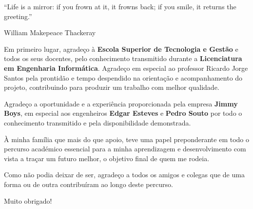 
\begin{flushright}
	\begin{quotebox50}
		``Life is a mirror: if you frown at it, it frowns back; if you smile, it returns the greeting.''

		\tcblower

		William Makepeace Thackeray
	\end{quotebox50}
\end{flushright}

Em primeiro lugar, agradeço à \textbf{Escola Superior de Tecnologia e Gestão} e todos os seus docentes, pelo conhecimento transmitido durante a \textbf{Licenciatura em Engenharia Informática}. Agradeço em especial ao professor Ricardo Jorge Santos pela prontidão e tempo despendido na orientação e acompanhamento do projeto, contribuindo para produzir um trabalho com melhor qualidade.

Agradeço a oportunidade e a experiência proporcionada pela empresa \textbf{Jimmy Boys}, em especial aos engenheiros \textbf{Edgar Esteves} e \textbf{Pedro Souto} por todo o conhecimento transmitido e pela disponibilidade demonstrada.

À minha família que mais do que apoio, teve uma papel preponderante em todo o percurso académico essencial para a minha aprendizagem e desenvolvimento com vista a traçar um futuro melhor, o objetivo final de quem me rodeia.

Como não podia deixar de ser, agradeço a todos os amigos e colegas que de uma forma ou de outra contribuíram ao longo deste percurso.

Muito obrigado!

\newpage
